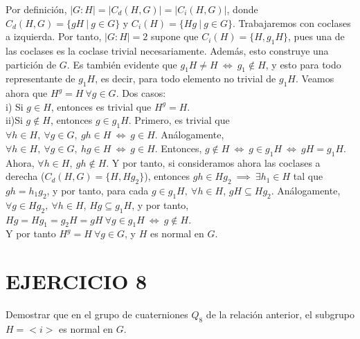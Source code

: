 \documentclass{article}
\begin{document}
Por definición, $|G:H| = |C_d(H, G)| = |C_i(H, G)|$, donde $C_d(H, G) = \{gH \ | \ g \in G\}$ y $C_i(H) = \{Hg \ | \ g \in G\}$. Trabajaremos con coclases a izquierda. Por tanto, $|G:H| = 2$ supone que $C_i(H) = \{H, g_1H\}$, pues una de las coclases es la coclase trivial necesariamente. Además, esto construye una partición de $G$. Es también evidente que $g_1H \neq H \ \iff \ g_1 \not\in H$, y esto para todo representante de $g_1H$, es decir, para todo elemento no trivial de $g_1H$. Veamos ahora que $H^g = H \ \forall g \in G$. Dos casos:\\
i) Si $g \in H$, entonces es trivial que $H^g = H$.\\
ii)Si $g \not\in H$, entonces $g \in g_1H$. Primero, es trivial que $\forall h \in H, \ \forall g \in G, \ gh \in H \ \iff \ g \in H$. Análogamente, $\forall h \in H, \ \forall g \in G, \ hg \in H \ \iff \ g \in H$. Entonces, $g \not\in H \ \iff \ g \in g_1H \ \iff \ gH = g_1H$. Ahora, $\forall h \in H, \ gh \not\in H$. Y por tanto, si consideramos ahora las coclases a derecha ($C_d(H, G) = \{H, Hg_2 \}$), entonces $gh \in Hg_2 \ \implies \ \exists h_1 \in H$ tal que $gh = h_1g_2$, y por tanto, para cada $g\in g_1H, \ \forall h \in H$, $gH \subseteq Hg_2$. Análogamente, $\forall g\in Hg_2, \ \forall h \in H$, $Hg \subseteq g_1H$, y por tanto, $Hg = Hg_1 = g_2H = gH \ \forall g \in g_1H \ \iff \ g\not\in H$.\\
Y por tanto $H^g = H \ \forall g \in G$, y $H$ es normal en $G$.\\

\section*{EJERCICIO 8}

Demostrar que en el grupo de cuaterniones $Q_8$ de la relación anterior, el subgrupo $H = <i>$ es normal en $G$.\\
\end{document}
